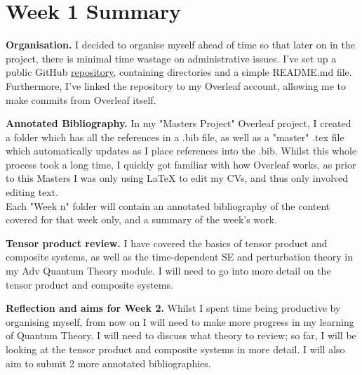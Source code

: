 \documentclass{article}
\begin{document}
\section*{Week 1 Summary}

\vspace{0.5cm}

\textbf{Organisation.} I decided to organise myself ahead of time so that later on in the project, there is minimal time wastage on administrative issues. I've set up a public GitHub \href{https://github.com/rowan-adeya/masters-project.git}{repository}, containing directories and a simple README.md file. Furthermore, I've linked the repository to my Overleaf account, allowing me to make commits from Overleaf itself.

\vspace{0.5cm}

\textbf{Annotated Bibliography.} In my "Masters Project" Overleaf project, I created a folder which has all the references in a .bib file, as well as a "master" 
.tex file which automatically updates as I place references into the .bib. Whilst this whole process took a long time, I quickly got familiar with how Overleaf works, as prior to this Masters I was only using LaTeX to edit my CVs, and thus only involved editing text. \\ Each "Week n" folder will contain an annotated bibliography of the content covered for that week only, and a summary of the week's work.

\vspace{0.5cm}

\textbf{Tensor product review.} I have covered the basics of tensor product and composite systems, as well as the time-dependent SE and perturbation theory in my Adv Quantum Theory module. I will need to go into more detail on the tensor product and composite systems. 
\vspace{0.5cm}

\textbf{Reflection and aims for Week 2.} Whilst I spent time being productive by organising myself, from now on I will need to make more progress in my learning of Quantum Theory. I will need to discuss what theory to review; so far, I will be looking at the tensor product and composite systems in more detail. I will also aim to submit 2 more annotated bibliographies. 
\end{document}
